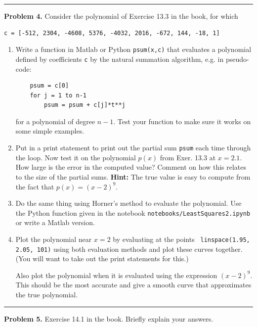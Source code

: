 \documentclass[10pt]{article}
\begin{document}
\vskip 1cm
\hrule
{\bf Problem 4.}
Consider the polynomial of Exercise 13.3 in the book, for which
\begin{verbatim}
c = [-512, 2304, -4608, 5376, -4032, 2016, -672, 144, -18, 1]
\end{verbatim} 

\begin{enumerate}
\item Write a function in Matlab or Python {\tt psum(x,c)} that evaluates a
polynomial defined by coefficients {\tt c}  by the natural summation
algorithm, e.g. in pseudo-code:
\begin{verbatim}
    psum = c[0]
    for j = 1 to n-1
        psum = psum + c[j]*t**j
\end{verbatim}
for a polynomial of degree $n-1$.
Test your function to make sure it works on some simple examples.

\item

Put in a print statement to print out the partial sum {\tt psum} each
time through the loop.  Now test it on the polynomial $p(x)$ from Exer. 13.3
at $x = 2.1$.  How large is the error in the computed value?
Comment on how this relates to the size of the partial sums.
{\bf Hint:} The true value is easy to compute from the fact that $p(x) =
(x-2)^9$.

\item Do the same thing using Horner's method to evaluate the polynomial.
Use the Python function given in the
notebook {\tt notebooks/LeastSquares2.ipynb} or write a Matlab version.

\item Plot the polynomial near $x=2$ by evaluating at the points {\tt
linspace(1.95, 2.05, 101)} using both evaluation methods and plot these
curves together. (You will want to take out the print statements for this.)  

Also plot the polynomial when it is evaluated using the
expression $(x-2)^9$.  This should be the most accurate and give a smooth
curve that approximates the true polynomial.
\end{enumerate} 



\vskip 1cm
\hrule
{\bf Problem 5.}
Exercise 14.1 in the book.  Briefly explain your answers.
\end{document}
